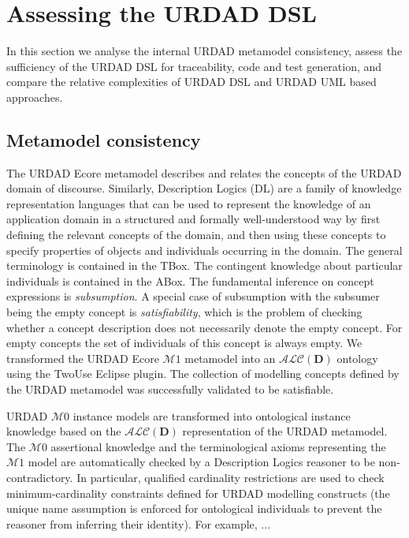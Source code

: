 \section{Assessing the URDAD DSL \label{sec:assessment}}

In this section we analyse the internal URDAD metamodel consistency, assess the sufficiency of the URDAD DSL for traceability, code and test generation, and compare the relative complexities of URDAD DSL and URDAD UML based approaches.


\subsection{Metamodel consistency}

The URDAD Ecore metamodel describes and relates the concepts of the URDAD domain of discourse. Similarly, Description Logics (DL) are a family of knowledge representation languages that can be used to represent the knowledge of an application domain in a structured and formally well-understood way by first defining the relevant concepts of the domain, and then using these concepts to specify properties of objects and individuals occurring in the domain. The general terminology is contained in the TBox. The contingent knowledge about particular individuals is contained in the ABox. The fundamental inference on concept expressions is \emph{subsumption}. A special case of subsumption with the subsumer being the empty concept is \emph{satisfiability}, which is the problem of checking whether a concept description does not necessarily denote the empty concept. For empty concepts the set of individuals of this concept is always empty. We transformed the URDAD Ecore $\mathcal{M}1$ metamodel into an $\mathcal{ALC}(\textbf{D})$ ontology using the TwoUse \cite{parreiras_using_2010} Eclipse plugin. The collection of modelling concepts defined by the URDAD metamodel was successfully validated to be satisfiable.

URDAD $\mathcal{M}0$ instance models are transformed into ontological instance knowledge based on the $\mathcal{ALC}(\textbf{D})$ representation of the URDAD metamodel. The $\mathcal{M}0$ assertional knowledge and the terminological axioms representing the $\mathcal{M}1$ model are automatically checked by a Description Logics reasoner to be non-contradictory. In particular, qualified cardinality restrictions are used to check minimum-cardinality constraints defined for URDAD modelling constructs (the unique name assumption is enforced for ontological individuals to prevent the reasoner from inferring their identity). For example, ...

